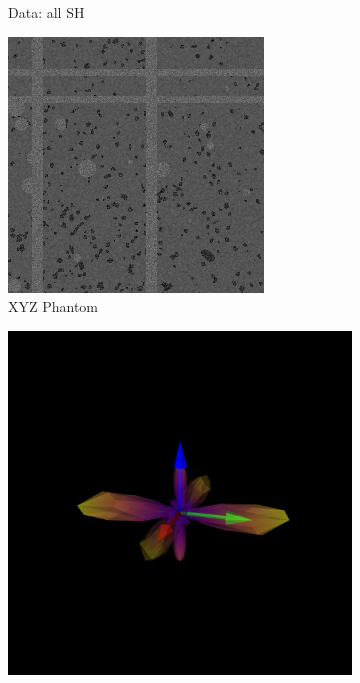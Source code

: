 \documentclass[11pt]{article}
\begin{document}
\begin{figure}[h]
\begin{subfigure}[b]{0.3\textwidth}
    \caption{Data: all SH}
  \end{subfigure}
  \vspace{4em}
  \begin{subfigure}[b]{0.3\textwidth}
    \includegraphics[width=\linewidth]{figs/xyz_phantom}
    \caption{XYZ Phantom}
  \end{subfigure}
  \hspace{1em}
  \begin{subfigure}[b]{0.3\textwidth}
    \includegraphics[width=\linewidth]{figs/phant_even}

\end{subfigure}
\end{figure}
\end{document}
